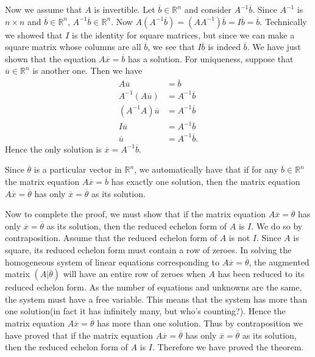 \documentclass[12pt]{article}
\def\bar#1{\overline{#1}}
\def\th{\theta} \def\al{\alpha} \def\ba{\beta} \def\ga{\gamma}
\def\R{\mathbb{R}} \def\Q{\mathbb{Q}} \def\N{\mathbb{N}} \def\Z{\mathbb{Z}} \def\P{\mathbb{P}}
\begin{document}
Now we assume that $A$ is invertible. Let $\bar{b} \in \R^n$ and consider $A^{-1}\bar{b}$. Since $A^{-1}$ is $n \times n$ and $\bar{b} \in \R^n$, $A^{-1}\bar{b} \in \R^n$. Now $A(A^{-1}\bar{b}) = (AA^{-1})\bar{b} = I\bar{b} = \bar{b}$. Technically we showed that $I$ is the identity for square matrices, but since we can make a square matrix whose columns are all $\bar{b}$, we see that $I\bar{b}$ is indeed $\bar{b}$. We have just shown that the equation $A\bar{x} = \bar{b}$ has a solution. For uniqueness, suppose that $\bar{u} \in \R^n$ is another one. Then we have
\begin{align*}
A\bar{u} &= \bar{b} \\
A^{-1}(A\bar{u}) &= A^{-1}\bar{b} \\
(A^{-1}A)\bar{u} &= A^{-1}\bar{b} \\
I\bar{u} &= A^{-1}\bar{b} \\
\bar{u} &= A^{-1}\bar{b}.
\end{align*}
Hence the only solution is $\bar{x} = A^{-1}\bar{b}$. 

Since $\bar{\th}$ is a particular vector in $\R^n$, we automatically have that if for any $\bar{b} \in \R^n$ the matrix equation $A\bar{x} = \bar{b}$ has exactly one solution, then the matrix equation $A\bar{x} = \bar{\th}$ has only $\bar{x} = \bar{\th}$ as its solution. 

Now to complete the proof, we must show that if the matrix equation $A\bar{x} = \bar{\th}$ has only $\bar{x} = \bar{\th}$ as its solution, then the reduced echelon form of $A$ is $I$. We do so by contraposition. Assume that the reduced echelon form of $A$ is not $I$. Since $A$ is square, its reduced echelon form must contain a row of zeroes. In solving the homogeneous system of linear equations corresponding to $A\bar{x} = \bar{\th}$, the augmented matrix $(A | \bar{\th})$ will have an entire row of zeroes when $A$ has been reduced to its reduced echelon form. As the number of equations and unknowns are the same, the system must have a free variable. This means that the system has more than one solution(in fact it has infinitely many, but who's counting?). Hence the matrix equation $A\bar{x} = \bar{\th}$ has more than one solution. Thus by contraposition we have proved that if the matrix equation $A\bar{x} = \bar{\th}$ has only $\bar{x} = \bar{\th}$ as its solution, then the reduced echelon form of $A$ is $I$. Therefore we have proved the theorem.
\end{document}
